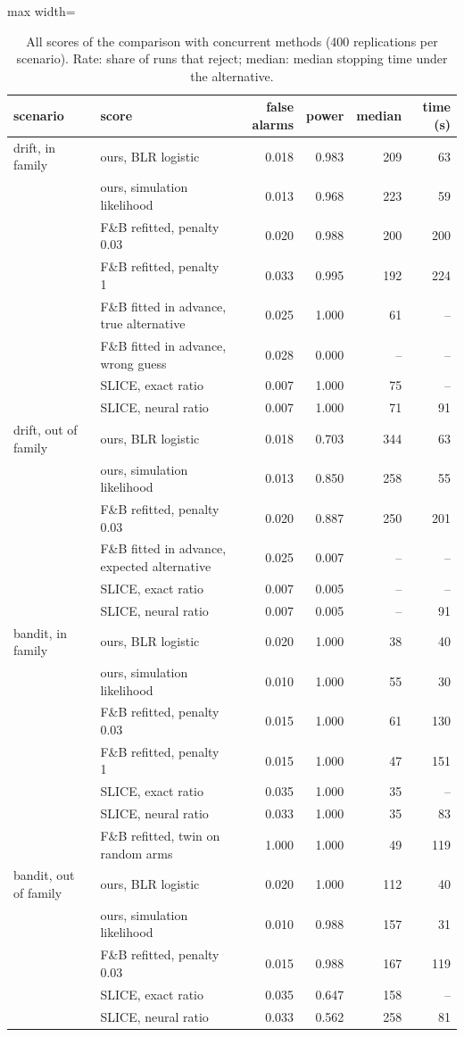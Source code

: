 \documentclass[11pt]{article}
\theoremstyle{remark}
\begin{document}
\begin{table}[h]
\centering
\caption{All scores of the comparison with concurrent methods (400
replications per scenario). Rate: share of runs that reject; median: median
stopping time under the alternative.}
\label{tab:concurrent-full}
\small
\begin{adjustbox}{max width=\textwidth}
\begin{tabular}{llrrrr}
\toprule
scenario & score & false alarms & power & median & time (s) \\
\midrule
drift, in family & ours, BLR logistic & 0.018 & 0.983 & 209 & 63 \\
 & ours, simulation likelihood & 0.013 & 0.968 & 223 & 59 \\
 & F\&B refitted, penalty 0.03 & 0.020 & 0.988 & 200 & 200 \\
 & F\&B refitted, penalty 1 & 0.033 & 0.995 & 192 & 224 \\
 & F\&B fitted in advance, true alternative & 0.025 & 1.000 & 61 & -- \\
 & F\&B fitted in advance, wrong guess & 0.028 & 0.000 & -- & -- \\
 & SLICE, exact ratio & 0.007 & 1.000 & 75 & -- \\
 & SLICE, neural ratio & 0.007 & 1.000 & 71 & 91 \\
drift, out of family & ours, BLR logistic & 0.018 & 0.703 & 344 & 63 \\
 & ours, simulation likelihood & 0.013 & 0.850 & 258 & 55 \\
 & F\&B refitted, penalty 0.03 & 0.020 & 0.887 & 250 & 201 \\
 & F\&B fitted in advance, expected alternative & 0.025 & 0.007 & -- & -- \\
 & SLICE, exact ratio & 0.007 & 0.005 & -- & -- \\
 & SLICE, neural ratio & 0.007 & 0.005 & -- & 91 \\
bandit, in family & ours, BLR logistic & 0.020 & 1.000 & 38 & 40 \\
 & ours, simulation likelihood & 0.010 & 1.000 & 55 & 30 \\
 & F\&B refitted, penalty 0.03 & 0.015 & 1.000 & 61 & 130 \\
 & F\&B refitted, penalty 1 & 0.015 & 1.000 & 47 & 151 \\
 & SLICE, exact ratio & 0.035 & 1.000 & 35 & -- \\
 & SLICE, neural ratio & 0.033 & 1.000 & 35 & 83 \\
 & F\&B refitted, twin on random arms & 1.000 & 1.000 & 49 & 119 \\
bandit, out of family & ours, BLR logistic & 0.020 & 1.000 & 112 & 40 \\
 & ours, simulation likelihood & 0.010 & 0.988 & 157 & 31 \\
 & F\&B refitted, penalty 0.03 & 0.015 & 0.988 & 167 & 119 \\
 & SLICE, exact ratio & 0.035 & 0.647 & 158 & -- \\
 & SLICE, neural ratio & 0.033 & 0.562 & 258 & 81 \\
\bottomrule
\end{tabular}
\end{adjustbox}
\end{table}
\end{document}
